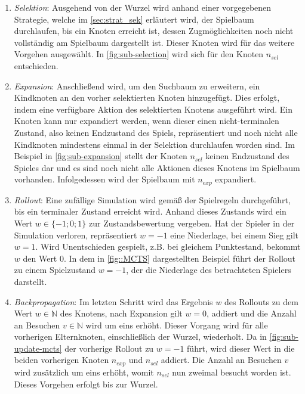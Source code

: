 \documentclass[12pt,a4paper,bibliography=totocnumbered,listof=totocnumbered]{article}
\begin{document}
\begin{enumerate}
\item \emph{Selektion}: Ausgehend von der Wurzel wird anhand einer vorgegebenen Strategie, welche im \autoref{sec:strat_sek} erläutert wird, der Spielbaum durchlaufen, bis ein Knoten erreicht ist, dessen Zugmöglichkeiten noch nicht vollständig am Spielbaum dargestellt ist. Dieser Knoten wird für das weitere Vorgehen ausgewählt. In \autoref{fig:sub-selection} wird sich für den Knoten $n_{sel}$ entschieden. \label{item:selekt}
\item \emph{Expansion}: Anschließend wird, um den Suchbaum zu erweitern, ein Kindknoten an den vorher selektierten Knoten hinzugefügt. Dies erfolgt, indem eine verfügbare Aktion des selektierten Knotens ausgeführt wird. Ein Knoten kann nur expandiert werden, wenn dieser einen nicht-terminalen Zustand, also keinen Endzustand des Spiels, repräsentiert und noch nicht alle Kindknoten mindestens einmal in der Selektion durchlaufen worden sind. Im Beispiel in \autoref{fig:sub-expansion} stellt der Knoten $n_{sel}$ keinen Endzustand des Spieles dar und es sind noch nicht alle Aktionen dieses Knotens im Spielbaum vorhanden. Infolgedessen wird der Spielbaum mit $n_{exp}$ expandiert. 
\item \emph{Rollout}: Eine zufällige Simulation wird gemäß der Spielregeln durchgeführt, bis ein terminaler Zustand erreicht wird. Anhand dieses Zustands wird ein Wert $w \in \{-1;0;1\}$ zur Zustandsbewertung vergeben. Hat der Spieler in der Simulation verloren, repräsentiert $w=-1$ eine Niederlage, bei einem Sieg gilt $w=1$. Wird Unentschieden gespielt, z.B. bei gleichem Punktestand, bekommt $w$ den Wert 0. In dem in \autoref{fig::MCTS} dargestellten Beispiel führt der Rollout zu einem Spielzustand $w=-1$, der die Niederlage des betrachteten Spielers darstellt. 
\item \emph{Backpropagation}: Im letzten Schritt wird das Ergebnis $w$ des Rollouts zu dem Wert $w\in \mathbb{N}$ des Knotens, nach Expansion gilt $w=0$, addiert und die Anzahl an Besuchen $v \in \mathbb{N}$ wird um eins erhöht. Dieser Vorgang wird für alle vorherigen Elternknoten, einschließlich der Wurzel, wiederholt. Da in \autoref{fig:sub-update-mcts} der vorherige Rollout zu $w=-1$ führt, wird dieser Wert in die beiden vorherigen Knoten $n_{exp}$ und $n_{sel}$ addiert. Die Anzahl an Besuchen $v$ wird zusätzlich um eins erhöht, womit $n_{sel}$ nun zweimal besucht worden ist. Dieses Vorgehen erfolgt bis zur Wurzel. \label{item:roll}
\end{enumerate}
\end{document}
